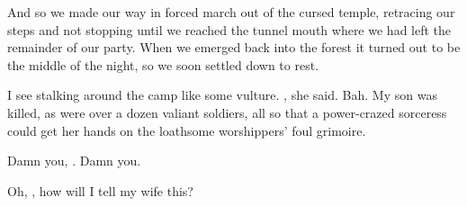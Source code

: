\begin{diary}
And so we made our way in forced march out of the cursed temple, retracing our steps and not stopping until we reached the tunnel mouth where we had left the remainder of our party. 
When we emerged back into the forest it turned out to be the middle of the night, so we soon settled down to rest. 

I see \Takestsha{} stalking around the camp like some vulture. 
, she said. 
Bah. 
My son was killed, as were over a dozen valiant soldiers, all so that a power-crazed sorceress could get her hands on the loathsome \daemon{} worshippers' foul grimoire. 

Damn you, \Takestsha. 
Damn you. 

Oh, \Iquin, how will I tell my wife this? 
\end{diary}









\noindent
{}










